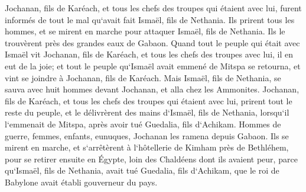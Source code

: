 \verse Jochanan, fils de Karéach, et tous les chefs des troupes qui étaient avec lui, furent informés de tout le mal qu`avait fait Ismaël, fils de Nethania. 
\verse Ils prirent tous les hommes, et se mirent en marche pour attaquer Ismaël, fils de Nethania. Ils le trouvèrent près des grandes eaux de Gabaon. 
\verse Quand tout le peuple qui était avec Ismaël vit Jochanan, fils de Karéach, et tous les chefs des troupes avec lui, il en eut de la joie; 
\verse et tout le peuple qu`Ismaël avait emmené de Mitspa se retourna, et vint se joindre à Jochanan, fils de Karéach. 
\verse Mais Ismaël, fils de Nethania, se sauva avec huit hommes devant Jochanan, et alla chez les Ammonites. 
\verse Jochanan, fils de Karéach, et tous les chefs des troupes qui étaient avec lui, prirent tout le reste du peuple, et le délivrèrent des mains d`Ismaël, fils de Nethania, lorsqu`il l`emmenait de Mitspa, après avoir tué Guedalia, fils d`Achikam. Hommes de guerre, femmes, enfants, eunuques, Jochanan les ramena depuis Gabaon. 
\verse Ils se mirent en marche, et s`arrêtèrent à l`hôtellerie de Kimham près de Bethléhem, pour se retirer ensuite en Égypte, 
\verse loin des Chaldéens dont ils avaient peur, parce qu`Ismaël, fils de Nethania, avait tué Guedalia, fils d`Achikam, que le roi de Babylone avait établi gouverneur du pays. 

